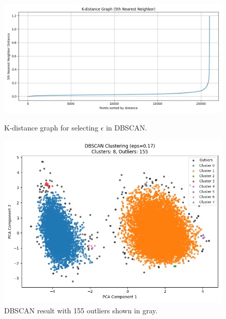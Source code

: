 \documentclass[12pt]{article}
\begin{document}
\begin{figure}[H]
    \centering
    \begin{minipage}[t]{0.48\textwidth}
        \includegraphics[width=\textwidth]{figures/dbscan_k_distance_explained.png}
        \caption{K-distance graph for selecting $\epsilon$ in DBSCAN.}
        \label{E}
    \end{minipage}
    \hfill
    \begin{minipage}[t]{0.48\textwidth}
        \includegraphics[width=\textwidth]{figures/dbscan_result_explained.png}
        \caption{DBSCAN result with 155 outliers shown in gray.}
        \label{F}
    \end{minipage}
\end{figure}
\end{document}
